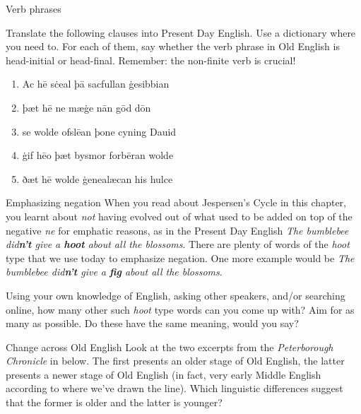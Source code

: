 \begin{exercises}{Verb phrases}\label{exercise-OE-VPs}

Translate the following clauses into Present Day English. Use a dictionary where you need to. For each of them, say whether the verb phrase in Old English is head-initial or head-final. Remember: the non-finite verb is crucial!

\begin{enumerate}
    \item Ac hē sċeal þā sacfullan ġesibbian
    \item þæt hē ne mæġe nān gōd dōn
    \item se wolde ofslēan þone cyning Dauid
    \item ġif hēo þæt bysmor forbēran wolde
    \item ðæt hē wolde ġenealæcan his hulce
\end{enumerate}

\end{exercises}

\begin{exercises}{Emphasizing negation}
When you read about Jespersen's Cycle in this chapter, you learnt about \textit{not} having evolved out of what used to be added on top of the negative \textit{ne} for emphatic reasons, as in the Present Day English \textit{The bumblebee did\textbf{n't} give a \textbf{hoot} about all the blossoms}. There are plenty of words of the \textit{hoot} type that we use today to emphasize negation. One more example would be \textit{The bumblebee did\textbf{n't} give a \textbf{fig} about all the blossoms}. 

\newpage
Using your own knowledge of English, asking other speakers, and/or searching online, how many other such \textit{hoot} type words can you come up with? Aim for as many as possible. Do these have the same meaning, would you say?

\end{exercises}

\begin{exercises}{Change across Old English}
Look at the two excerpts from the \textit{Peterborough Chronicle} in  below. The first presents an older stage of Old English, the latter presents a newer stage of Old English (in fact, very early Middle English according to where we've drawn the line). Which linguistic differences suggest that the former is older and the latter is younger?

\end{exercises}

